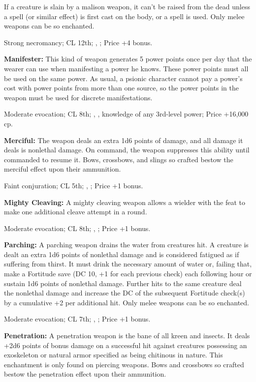 If a creature is slain by a malison weapon, it can't be raised from the dead unless a  spell (or similar effect) is first cast on the body, or a  spell is used. Only melee weapons can be so enchanted.

Strong necromancy; CL 12th; , ; Price +4 bonus.

\textbf{Manifester:} This kind of weapon generates 5 power points once per day that the wearer can use when manifesting a power he knows. These power points must all be used on the same power. As usual, a psionic character cannot pay a power's cost with power points from more than one source, so the power points in the weapon must be used for discrete manifestations.

Moderate evocation; CL 8th; , , knowledge of any 3rd-level power; Price +16,000 cp.

\textbf{Merciful:} The weapon deals an extra 1d6 points of damage, and all damage it deals is nonlethal damage. On command, the weapon suppresses this ability until commanded to resume it. Bows, crossbows, and slings so crafted bestow the merciful effect upon their ammunition.

Faint conjuration; CL 5th; , ; Price +1 bonus.

\textbf{Mighty Cleaving:} A mighty cleaving weapon allows a wielder with the  feat to make one additional cleave attempt in a round.

Moderate evocation; CL 8th; , ; Price +1 bonus.

\textbf{Parching:} A parching weapon drains the water from creatures hit. A creature is dealt an extra 1d6 points of nonlethal damage and is considered fatigued as if suffering from thirst. It must drink the necessary amount of water or, failing that, make a Fortitude save (DC 10, +1 for each previous check) each following hour or sustain 1d6 points of nonlethal damage. Further hits to the same creature deal the nonlethal damage and increase the DC of the subsequent Fortitude check(s) by a cumulative +2 per additional hit. Only melee weapons can be so enchanted.

Moderate evocation; CL 7th; , ; Price +1 bonus.

\textbf{Penetration:} A penetration weapon is the bane of all kreen and insects. It deals +2d6 points of bonus damage on a successful hit against creatures possessing an exoskeleton or natural armor specified as being chitinous in nature. This enchantment is only found on piercing weapons. Bows and crossbows so crafted bestow the penetration effect upon their ammunition.

